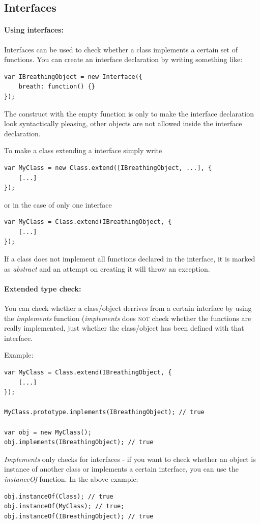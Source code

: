 \documentclass[10pt,a4paper]{report}
\begin{document}
\subsection*{Interfaces}

\paragraph{Using interfaces:}
Interfaces can be used to check whether a class implements a certain set of functions. You can create an interface declaration by writing something like:
\begin{verbatim}
var IBreathingObject = new Interface({
    breath: function() {}
});
\end{verbatim}
The construct with the empty function is only to make the interface declaration look syntactically pleasing, other objects are not allowed inside the interface declaration.

To make a class extending a interface simply write
\begin{verbatim}
var MyClass = new Class.extend([IBreathingObject, ...], {
    [...]
});
\end{verbatim}
or in the case of only one interface
\begin{verbatim}
var MyClass = Class.extend(IBreathingObject, {
    [...]
});
\end{verbatim}
If a class does not implement all functions declared in the interface, it is marked as \textit{abstract} and an attempt on creating it will throw an exception.

\paragraph{Extended type check:}
You can check whether a class/object derrives from a certain interface by using the \textit{implements} function (\textit{implements} does \textsc{not} check whether the functions are really implemented, just whether the class/object has been defined with that interface.

Example:
\begin{verbatim}
var MyClass = Class.extend(IBreathingObject, {
	[...]
});

MyClass.prototype.implements(IBreathingObject); // true

var obj = new MyClass();
obj.implements(IBreathingObject); // true
\end{verbatim}

\textit{Implements} only checks for interfaces - if you want to check whether an object is instance of another class or implements a certain interface, you can use the \textit{instanceOf} function. In the above example:
\begin{verbatim}
obj.instanceOf(Class); // true
obj.instanceOf(MyClass); // true;
obj.instanceOf(IBreathingObject); // true
\end{verbatim}
\end{document}
